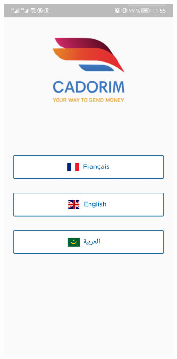 \begin{itemize}[label=$\ast$]
			\begin{figure}[!ht]
				\centering
				\begin{subfigure}{0.3\textwidth}
					\includegraphics[width=\hsize, valign=m ]{./Template LaTeX/Images/1.jpg}

\end{subfigure}
\end{figure}
\end{itemize}
